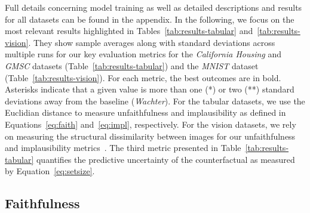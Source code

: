 \documentclass[letterpaper]{article} %
\begin{document}
Full details concerning model training as well as detailed descriptions and results for all datasets can be found in the appendix. In the following, we focus on the most relevant results highlighted in Tables~\ref{tab:results-tabular} and~\ref{tab:results-vision}. They show sample averages along with standard deviations across multiple runs for our key evaluation metrics for the \textit{California Housing} and \textit{GMSC} datasets (Table~\ref{tab:results-tabular}) and the \textit{MNIST} dataset (Table~\ref{tab:results-vision}). For each metric, the best outcomes are in bold. Asterisks indicate that a given value is more than one (*) or two (**) standard deviations away from the baseline (\textit{Wachter}). For the tabular datasets, we use the Euclidian distance to measure unfaithfulness and implausibility as defined in Equations~\ref{eq:faith} and~\ref{eq:impl}, respectively. For the vision datasets, we rely on measuring the structural dissimilarity between images for our unfaithfulness and implausibility metrics~\citep{wang2003multiscale}. The third metric presented in Table~\ref{tab:results-tabular} quantifies the predictive uncertainty of the counterfactual as measured by Equation~\ref{eq:setsize}. 

\subsection{Faithfulness}
\end{document}
